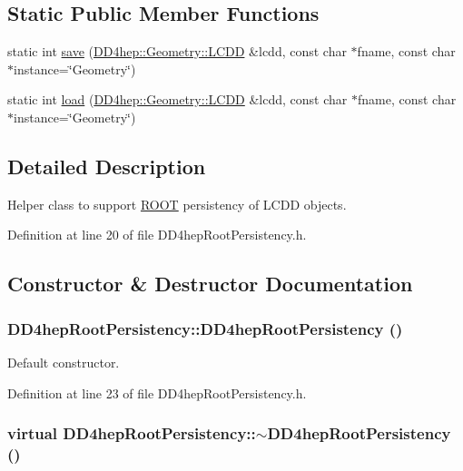 \subsection*{Static Public Member Functions}
\begin{DoxyCompactItemize}
\item 
static int \hyperlink{class_d_d4hep_root_persistency_a29e9e5f5a15dd597278c5960d25c69f3}{save} (\hyperlink{class_d_d4hep_1_1_geometry_1_1_l_c_d_d}{DD4hep::Geometry::LCDD} \&lcdd, const char $\ast$fname, const char $\ast$instance=\char`\"{}Geometry\char`\"{})
\item 
static int \hyperlink{class_d_d4hep_root_persistency_a01f849c58fac51a46b47bcaf18fb87cf}{load} (\hyperlink{class_d_d4hep_1_1_geometry_1_1_l_c_d_d}{DD4hep::Geometry::LCDD} \&lcdd, const char $\ast$fname, const char $\ast$instance=\char`\"{}Geometry\char`\"{})
\end{DoxyCompactItemize}


\subsection{Detailed Description}
Helper class to support \hyperlink{namespace_r_o_o_t}{ROOT} persistency of LCDD objects. 

Definition at line 20 of file DD4hepRootPersistency.h.

\subsection{Constructor \& Destructor Documentation}
\hypertarget{class_d_d4hep_root_persistency_ac24a71ad3ca37110b7cb0b4f36abc300}{
\subsubsection[{DD4hepRootPersistency}]{\setlength{\rightskip}{0pt plus 5cm}DD4hepRootPersistency::DD4hepRootPersistency ()}}
\label{class_d_d4hep_root_persistency_ac24a71ad3ca37110b7cb0b4f36abc300}


Default constructor. 

Definition at line 23 of file DD4hepRootPersistency.h.\hypertarget{class_d_d4hep_root_persistency_a3abaa5bb63ce254a41b17df3d78fc005}{
\subsubsection[{$\sim$DD4hepRootPersistency}]{\setlength{\rightskip}{0pt plus 5cm}virtual DD4hepRootPersistency::$\sim$DD4hepRootPersistency ()}}
\label{class_d_d4hep_root_persistency_a3abaa5bb63ce254a41b17df3d78fc005}


